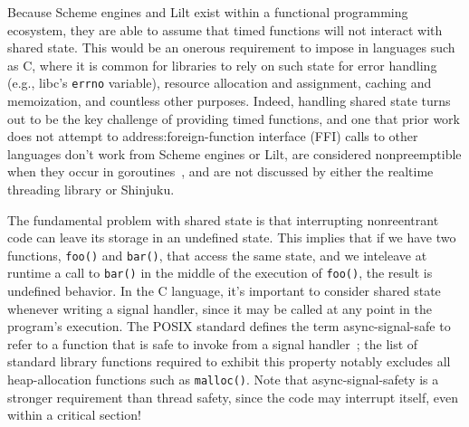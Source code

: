 
Because Scheme engines and Lilt exist within a functional programming ecosystem, they
are able to assume that timed functions will not interact with shared state.  This
would be an onerous requirement to impose in languages such as C, where it is
common for libraries to rely on such state for error handling (e.g., libc's
\texttt{errno} variable), resource allocation and assignment, caching and
memoization, and countless other purposes.  Indeed, handling shared state turns out
to be the key challenge of providing timed functions, and one that prior work does
not attempt to address:\@ foreign-function interface (FFI) calls to other languages
don't work from Scheme engines or Lilt, are considered nonpreemptible when they
occur in goroutines~\cite{www-golang-fficall}, and are not discussed by either the
realtime threading library or Shinjuku.

The fundamental problem with shared state is that interrupting nonreentrant code can
leave its storage in an undefined state.  This implies that if we have two functions,
\texttt{foo()} and \texttt{bar()}, that access the same state, and we inteleave at
runtime a call to \texttt{bar()} in the middle of the execution of \texttt{foo()},
the result is undefined behavior.  In the C language, it's important to consider
shared state whenever writing a signal handler, since it may be called at any point
in the program's execution.  The POSIX standard defines the term async-signal-safe to
refer to a function that is safe to invoke from a signal
handler~\cite{signal-safety-manpage}; the list of standard library functions required
to exhibit this property notably excludes all heap-allocation functions such as
\texttt{malloc()}.  Note that async-signal-safety is a stronger requirement than
thread safety, since the code may interrupt itself, even within a critical section!



